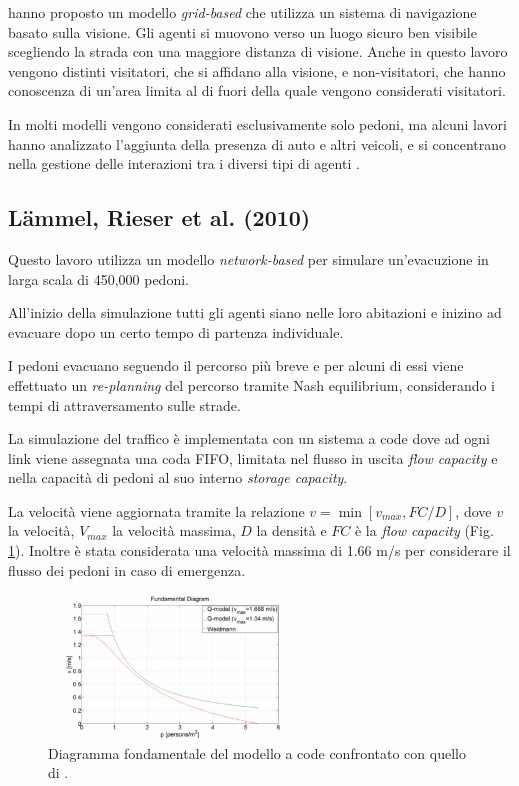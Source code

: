 \textcite{wijerathne2013hpc} hanno proposto un modello \textit{grid-based} che utilizza un sistema di navigazione basato
sulla visione. Gli agenti si muovono verso un luogo sicuro ben visibile scegliendo la strada con una maggiore distanza di visione.
%
Anche in questo lavoro vengono distinti visitatori, che si affidano alla visione, e non-visitatori, che hanno conoscenza di un'area
limita al di fuori della quale vengono considerati visitatori.

In molti modelli vengono considerati esclusivamente solo pedoni, ma alcuni lavori hanno analizzato l'aggiunta della presenza di auto e altri veicoli,
e si concentrano nella gestione delle interazioni tra i diversi tipi di agenti \parencite{goto2012tsunami, wang2016agent, wang2021novel}.

\subsection{L\"ammel, Rieser et al. (2010)}
Questo lavoro utilizza un modello \textit{network-based} per simulare un'evacuzione in larga scala di 450,000 pedoni.

All'inizio della simulazione tutti gli agenti siano nelle loro abitazioni 
e inizino ad evacuare dopo un certo tempo di partenza individuale.

I pedoni evacuano seguendo il percorso più breve e per alcuni di essi viene effettuato un \textit{re-planning} del percorso tramite Nash equilibrium,
considerando i tempi di attraversamento sulle strade.

La simulazione del traffico è implementata con un sistema a code dove ad ogni link viene assegnata una coda FIFO, 
limitata nel flusso in uscita \textit{flow capacity} e nella capacità di pedoni al suo interno \textit{storage capacity}.

La velocità viene aggiornata tramite la relazione $v = \min[v_{max}, FC / D]$, dove $v$ la velocità,
$V_{max}$ la velocità massima, $D$ la densità e $FC$ è la \textit{flow capacity} (Fig. \ref{fig:queue-model}).
%
Inoltre è stata considerata una velocità massima di 1.66 m/s per considerare il
flusso dei pedoni in caso di emergenza.

\begin{figure}[ht]
    \centering
    \includegraphics[width=0.6\textwidth]{images/queue-model.png}
    \caption{Diagramma fondamentale del modello a code confrontato con quello di \textcite{weidmann1993transporttechnik}.}
    \label{fig:queue-model}
\end{figure}

